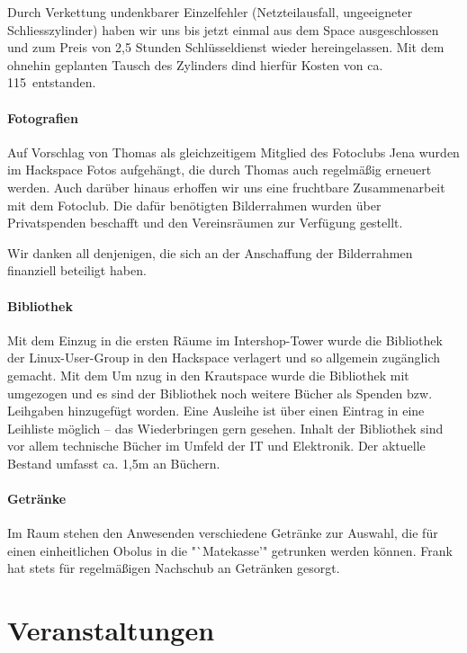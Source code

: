 \documentclass[10pt,DIV16]{scrartcl}
\begin{document}
\label{sec:tueroeffnung}
Durch Verkettung undenkbarer Einzelfehler (Netzteilausfall,
ungeeigneter Schliesszylinder) haben wir uns bis jetzt einmal aus
dem Space ausgeschlossen und zum Preis von 2,5 Stunden
Schlüsseldienst wieder hereingelassen. Mit dem ohnehin geplanten
Tausch des Zylinders dind hierfür Kosten von ca. 115\EUR\ entstanden.

\paragraph{Fotografien}

Auf Vorschlag von Thomas als gleichzeitigem Mitglied des Fotoclubs
Jena wurden im Hackspace Fotos aufgehängt, die durch Thomas auch
regelmäßig erneuert werden.  Auch darüber hinaus erhoffen wir uns
eine fruchtbare Zusammenarbeit mit dem Fotoclub. Die dafür
benötigten Bilderrahmen wurden über Privatspenden beschafft und den
Vereinsräumen zur Verfügung gestellt.

Wir danken all denjenigen, die sich an der Anschaffung der Bilderrahmen
finanziell beteiligt haben.

\paragraph{Bibliothek}

Mit dem Einzug in die ersten Räume im Intershop-Tower wurde die
Bibliothek der Linux-User-Group in den Hackspace verlagert und so
allgemein zugänglich gemacht. Mit dem Um nzug in den Krautspace
wurde die Bibliothek mit umgezogen und es sind der Bibliothek noch
weitere Bücher als Spenden bzw. Leihgaben hinzugefügt worden. Eine
Ausleihe ist über einen Eintrag in eine Leihliste möglich -- das
Wiederbringen gern gesehen. Inhalt der Bibliothek sind vor allem
technische Bücher im Umfeld der IT und Elektronik. Der aktuelle
Bestand umfasst ca. 1,5m an Büchern.

\paragraph{Getränke}
\label{sec:getraenke}

Im Raum stehen den Anwesenden verschiedene Getränke zur Auswahl, die
für einen einheitlichen Obolus in die "`Matekasse'" getrunken werden
können. Frank hat stets für regelmäßigen Nachschub an Getränken
gesorgt.

\section{Veranstaltungen}
\end{document}

